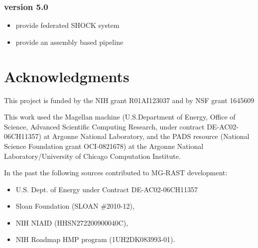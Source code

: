 \documentclass[12pt,fullpage]{report}
\begin{document}
\subsubsection*{version 5.0}
\begin{itemize}
\item provide federated SHOCK system 
\item provide an assembly based pipeline
\end{itemize}
\section*{Acknowledgments}

This project is funded by the NIH grant R01AI123037 and by NSF grant 1645609

This work used the Magellan machine (U.S.Department of Energy, Office of Science, 
Advanced Scientific Computing Research, under contract  DE-AC02-06CH11357) at Argonne National Laboratory, and the PADS resource (National Science Foundation grant OCI-0821678) at the Argonne National Laboratory/University of Chicago Computation Institute. 

In the past the following sources contributed to MG-RAST development:
\begin{itemize}
\item U.S. Dept. of Energy under Contract DE-AC02-06CH11357
\item Sloan Foundation (SLOAN \#2010-12), 
\item NIH NIAID (HHSN272200900040C), 
\item  NIH Roadmap HMP program (1UH2DK083993-01).
 \end{itemize}
 
\end{document}
